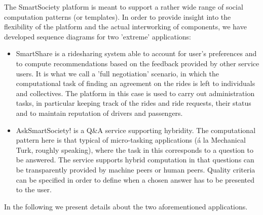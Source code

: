 The SmartSociety platform is meant to support a rather wide range of
social computation patterns (or templates). In order to provide
insight into the flexibility of the platform and the actual
interworking of components, we have developed sequence diagrams for two
'extreme' applications:
\begin{itemize}
\item SmartShare is a ridesharing system able to account for user's
preferences and to compute recommendations based on the feedback
provided by other service users. It is what we call a 'full
negotiation' scenario, in which the computational task of finding an
agreement on the rides is left to individuals and collectives. The
platform in this case is used to carry out administration tasks, in
particular keeping track of the rides and ride requests, their status
and to maintain reputation of drivers and passengers.
\item AskSmartSociety! is a Q\&A service supporting hybridity. The
computational pattern here is that typical of micro-tasking
applications (\'a la Mechanical Turk, roughly speaking), where the
task in this corresponds to a question to be answered. The service
supports hybrid computation in that questions can be transparently
provided by machine peers or human peers. Quality criteria can be
specified in order to define when a chosen answer has to be presented
to the user. 
\end{itemize}
In the following we present details about the two aforementioned
applications. 
